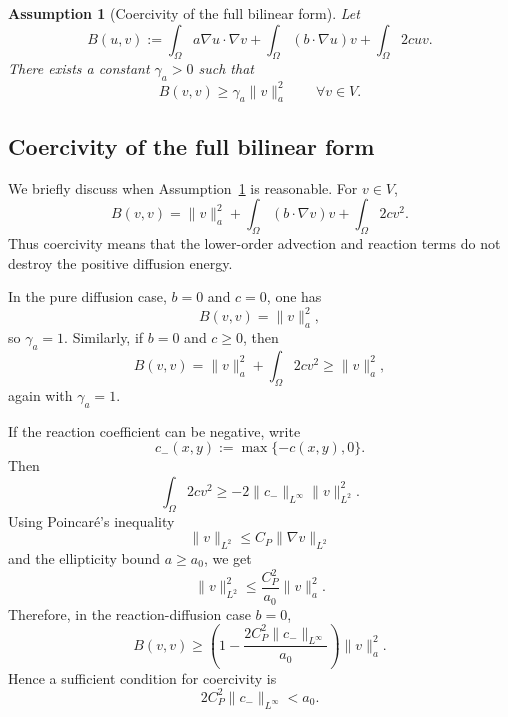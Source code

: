 \documentclass[11pt]{article}
\newtheorem{assumption}{Assumption}
\begin{document}
\begin{assumption}[Coercivity of the full bilinear form]
\label{assumption:coercivity}
Let
\begin{equation}
    B(u,v)
    :=
    \int_\Omega a\nabla u\cdot\nabla v
    +
    \int_\Omega (b\cdot\nabla u)v
    +
    \int_\Omega 2cuv.
    \label{eq:full-bilinear-form}
\end{equation}
There exists a constant \(\gamma_a>0\) such that
\begin{equation}
    B(v,v)
    \ge
    \gamma_a \|v\|_a^2
    \qquad
    \forall v\in V.
    \label{eq:coercivity}
\end{equation}
\end{assumption}

\subsection{Coercivity of the full bilinear form}
\label{subsec:coercivity-discussion}

We briefly discuss when Assumption~\ref{assumption:coercivity} is
reasonable.  For \(v\in V\),
\begin{equation}
    B(v,v)
    =
    \|v\|_a^2
    +
    \int_\Omega (b\cdot\nabla v)v
    +
    \int_\Omega 2cv^2.
    \label{eq:Bvv-expanded}
\end{equation}
Thus coercivity means that the lower-order advection and reaction terms
do not destroy the positive diffusion energy.

In the pure diffusion case, \(b=0\) and \(c=0\), one has
\[
    B(v,v)=\|v\|_a^2,
\]
so \(\gamma_a=1\).  Similarly, if \(b=0\) and \(c\ge0\), then
\[
    B(v,v)=\|v\|_a^2+\int_\Omega 2cv^2
    \ge
    \|v\|_a^2,
\]
again with \(\gamma_a=1\).

If the reaction coefficient can be negative, write
\[
    c_-(x,y):=\max\{-c(x,y),0\}.
\]
Then
\[
    \int_\Omega 2cv^2
    \ge
    -2\|c_-\|_{L^\infty}\|v\|_{L^2}^2.
\]
Using Poincaré's inequality
\[
    \|v\|_{L^2}\le C_P\|\nabla v\|_{L^2}
\]
and the ellipticity bound \(a\ge a_0\), we get
\[
    \|v\|_{L^2}^2
    \le
    \frac{C_P^2}{a_0}\|v\|_a^2.
\]
Therefore, in the reaction-diffusion case \(b=0\),
\[
    B(v,v)
    \ge
    \left(
    1-\frac{2C_P^2\|c_-\|_{L^\infty}}{a_0}
    \right)
    \|v\|_a^2.
\]
Hence a sufficient condition for coercivity is
\[
    2C_P^2\|c_-\|_{L^\infty}<a_0.
\]
\end{document}
